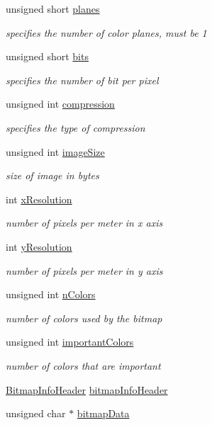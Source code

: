 \begin{DoxyCompactItemize}
unsigned short \hyperlink{group___bitmap_ga8c89d091e05544a82dc2398eed99634f}{planes}
\begin{DoxyCompactList}\small\item\em specifies the number of color planes, must be 1 \end{DoxyCompactList}\item 
unsigned short \hyperlink{group___bitmap_ga47d1d4d776f8fd3bb0f7dbc3c5aeb534}{bits}
\begin{DoxyCompactList}\small\item\em specifies the number of bit per pixel \end{DoxyCompactList}\item 
unsigned int \hyperlink{group___bitmap_gad180079f62b44e49ec672c9ef6e078b3}{compression}
\begin{DoxyCompactList}\small\item\em specifies the type of compression \end{DoxyCompactList}\item 
unsigned int \hyperlink{group___bitmap_gadcd57a0168319e747bc8099218d3822c}{image\+Size}
\begin{DoxyCompactList}\small\item\em size of image in bytes \end{DoxyCompactList}\item 
int \hyperlink{group___bitmap_gac6eaeb4c0876cf6cd899f41fe3c25ff5}{x\+Resolution}
\begin{DoxyCompactList}\small\item\em number of pixels per meter in x axis \end{DoxyCompactList}\item 
int \hyperlink{group___bitmap_gaa2f350dd0bda750656d5db5f5e37b2b3}{y\+Resolution}
\begin{DoxyCompactList}\small\item\em number of pixels per meter in y axis \end{DoxyCompactList}\item 
unsigned int \hyperlink{group___bitmap_gaed4506bad904845183194f199f1bdb98}{n\+Colors}
\begin{DoxyCompactList}\small\item\em number of colors used by the bitmap \end{DoxyCompactList}\item 
unsigned int \hyperlink{group___bitmap_ga8f7abfbc446b12f385d2b42c3b4fd9b0}{important\+Colors}
\begin{DoxyCompactList}\small\item\em number of colors that are important \end{DoxyCompactList}\item 
\hyperlink{struct_bitmap_info_header}{Bitmap\+Info\+Header} \hyperlink{group___bitmap_ga7157ca7f3ce4be47481c472fafd89313}{bitmap\+Info\+Header}
\item 
unsigned char $\ast$ \hyperlink{group___bitmap_ga586c4bcc42cf22a033e8f60f24f627f0}{bitmap\+Data}
\end{DoxyCompactItemize}



